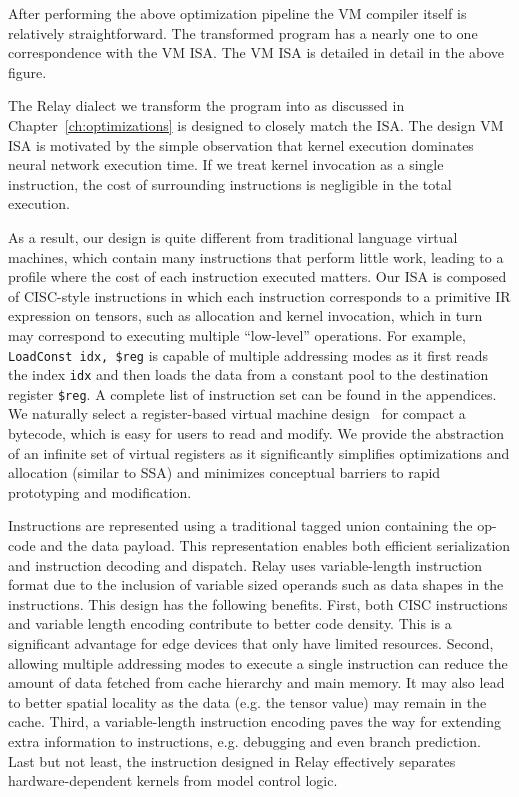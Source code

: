 After performing the above optimization pipeline the VM compiler
  itself is relatively straightforward.
The transformed program has a nearly one to one correspondence
  with the VM ISA.
The VM ISA is detailed in detail in the above figure.

The Relay dialect we transform the program into as discussed in Chapter~\ref{ch:optimizations}
  is designed to closely match the ISA.
The design VM ISA is motivated by the simple observation that
  kernel execution dominates neural network execution time.
If we treat kernel invocation as a single instruction,
  the cost of surrounding instructions is negligible in the total execution.

As a result, our design is quite different from traditional language virtual machines,
  which contain many instructions that perform little work,
  leading to a profile where the cost of each instruction executed matters.
Our ISA is composed of CISC-style instructions in which each instruction corresponds to a primitive
  IR expression on tensors, such as allocation and kernel invocation,
  which in turn may correspond to executing multiple ``low-level'' operations.
For example, \texttt{LoadConst idx, \$reg} is capable of multiple addressing modes
  as it first reads the index \texttt{idx} and then loads the data from a constant
  pool to the destination register \texttt{\$reg}.
A complete list of instruction set can be found in the appendices.
We naturally select a register-based virtual machine design~\citep{davis2003case} for compact a bytecode,
  which is easy for users to read and modify.
We provide the abstraction of an infinite set of virtual registers as it significantly simplifies optimizations
  and allocation (similar to SSA) and minimizes conceptual barriers to rapid prototyping and modification.

Instructions are represented using a traditional tagged union containing the op-code and the data payload.
This representation enables both efficient serialization and instruction decoding and dispatch.
Relay uses variable-length instruction format due to the inclusion of variable sized operands such as data shapes in the instructions.
This design has the following benefits. First, both CISC instructions and variable length encoding contribute to better code density.
This is a significant advantage for edge devices that only have limited resources.
Second, allowing multiple addressing modes to execute a single instruction can reduce the amount of data fetched from cache hierarchy and main memory.
It may also lead to better spatial locality as the data (e.g. the tensor value) may remain in the cache.
Third, a variable-length instruction encoding paves the way for extending extra information to instructions, e.g. debugging and even branch prediction.
Last but not least, the instruction designed in Relay effectively separates hardware-dependent kernels from model control logic.


